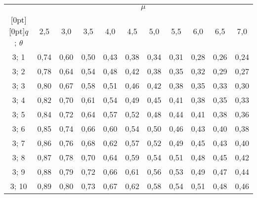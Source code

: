 \begin{table}\small
\begin{center}
\vspace*{2ex}

\begin{tabular}{|c|c|c|c|c|c|c|c|c|c|c|}
\hline
&\multicolumn{10}{c|}{$\mu$}\\
\cline{2-11}
\multicolumn{1}{|c|}{\raisebox{6pt}[0pt][0pt]{$q$; $\theta$}}
& 2,5& 3,0& 3,5& 4,0& 4,5& 5,0& 5,5& 6,0& 6,5& 7,0\\
\hline
 3;  1& 0,74& 0,60& 0,50& 0,43& 0,38& 0,34& 0,31& 0,28& 0,26& 0,24\\
 3;  2& 0,78& 0,64& 0,54& 0,48& 0,42& 0,38& 0,35& 0,32& 0,29& 0,27\\
 3;  3& 0,80& 0,67& 0,58& 0,51& 0,46& 0,42& 0,38& 0,35& 0,33& 0,30\\
 3;  4& 0,82& 0,70& 0,61& 0,54& 0,49& 0,45& 0,41& 0,38& 0,35& 0,33\\
 3;  5& 0,84& 0,72& 0,64& 0,57& 0,52& 0,48& 0,44& 0,41& 0,38& 0,36\\
 3;  6& 0,85& 0,74& 0,66& 0,60& 0,54& 0,50& 0,46& 0,43& 0,40& 0,38\\
 3;  7& 0,86& 0,76& 0,68& 0,62& 0,57& 0,52& 0,49& 0,45& 0,43& 0,40\\
 3;  8& 0,87& 0,78& 0,70& 0,64& 0,59& 0,54& 0,51& 0,48& 0,45& 0,42\\
 3;  9& 0,88& 0,79& 0,72& 0,66& 0,61& 0,56& 0,53& 0,49& 0,47& 0,44\\
 \hphantom{9}3; 10& 0,89& 0,80& 0,73& 0,67& 0,62& 0,58& 0,54& 0,51& 0,48& 0,46\\
\hline
\end{tabular}
\end{center}
\end{table}

